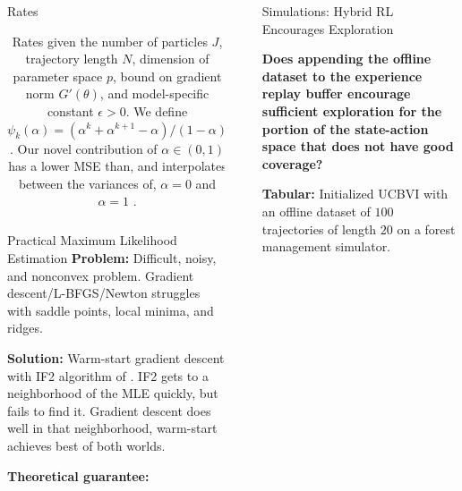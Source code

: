 \documentclass[final]{beamer}
\newlength{\sepwidth}
\newlength{\colwidth}
\newcommand{\separatorcolumn}{\begin{column}{\sepwidth}\end{column}}
\begin{document}
\begin{frame}[t]
\begin{columns}[t]
\begin{column}{\colwidth}
\begin{block}{Rates}
\begin{table}[t]
{\begin{tabular}{c  c}
\tabularnewline
\toprule 
\end{tabular}}
\medskip
\caption{Rates given the number of particles $J$, trajectory length $N$, dimension of parameter space $p$, bound on gradient norm $G'(\theta)$, and model-specific constant $\epsilon>0$. We define $\psi_k(\alpha)=\left(\alpha^k+\alpha^{k+1}-\alpha\right) /(1-\alpha)$. Our novel contribution of $\alpha \in (0,1)$ has a lower MSE than, and interpolates between the variances of, $\alpha=0$ \cite{naesseth18} and $\alpha=1$ \cite{poyiadjis11}.}
\label{tab:bounds}
\vspace{-5mm}
\end{table}
  \end{block}

\begin{block}{Practical Maximum Likelihood Estimation}
    \textbf{Problem:} Difficult, noisy, and nonconvex problem. Gradient descent/L-BFGS/Newton struggles with saddle points, local minima, and ridges.
    
    \textbf{Solution:} Warm-start gradient descent with IF2 algorithm of \cite{ionides15}. IF2 gets to a neighborhood of the MLE quickly, but fails to find it. Gradient descent does well in that neighborhood, warm-start achieves best of both worlds. 

    \textbf{Theoretical guarantee:} 

\end{block}


\end{column}

\separatorcolumn

\begin{column}{\colwidth}


  \begin{exampleblock}{Simulations: Hybrid RL Encourages Exploration}

  \textbf{Does appending the offline dataset to the experience replay buffer encourage sufficient exploration for the portion of the state-action space that does not have good coverage?}

  \textbf{Tabular:} Initialized UCBVI \cite{azar2017minimax} with an offline dataset of $100$ trajectories of length $20$ on a forest management simulator. 


\end{exampleblock}
\end{column}
\end{columns}
\end{frame}
\end{document}
